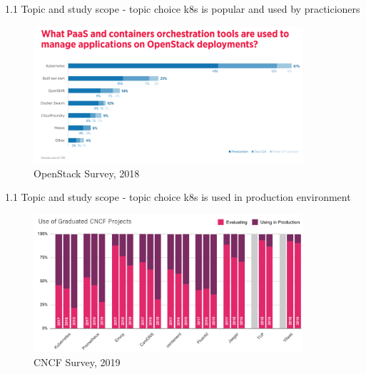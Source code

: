 \documentclass{beamer}
\begin{document}
\begin{frame}{1.1 Topic and study scope - topic choice}%
k8s is popular and used by practicioners
\begin{figure}
	\includegraphics[width=10cm]{figures/k8s-openstack-survey.png}
	\label{fig:k8s-openstack-survey}
	\\
	\tiny{OpenStack Survey, 2018}
\end{figure}
\end{frame}
	
\begin{frame}{1.1 Topic and study scope - topic choice}%
k8s is used in production environment
\begin{figure}
	\includegraphics[width=10cm]{figures/cncf-k8s-used-in-production.png}
	\label{fig:cncf-k8s-used-in-production}
	\\
	\tiny{CNCF Survey, 2019}
\end{figure}
\end{frame}
	
\end{document}
